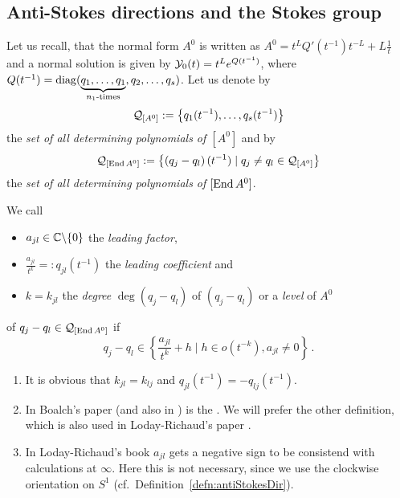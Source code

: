 \subsection{Anti-Stokes directions and the Stokes group}
Let us recall, that the normal form $A^0$ is written as
$A^0=t^LQ'(t^{-1})t^{-L}+L\frac{1}{t}$ and a normal solution is given by
$\mathcal{Y}_0(t)=t^Le^{Q(t^{-1})}$, where
$Q(t^{-1})=\diag(\underset{n_1\text{-times}}{\underbrace{%
  q_1,\dots,q_1}},q_2,\dots ,q_s)$.
Let us denote by
\[
  \mathcal{Q}_{[A^0]} := \left\{q_1(t^{-1}),\dots,q_s(t^{-1})\right\}
\]
the \emph{set of all determining polynomials of $[A^0]$} and by
\[
  \mathcal{Q}_{[\operatorname{End} A^0]}:=\left\{\left(q_j-q_l\right)(t^{-1})
    \mid q_j \neq q_l \in\mathcal{Q}_{[A^0]}
  \right\}
\]
the \emph{set of all determining polynomials of $[\operatorname{End} A^0]$}.
\begin{defn}\label{defn:determiningPolysOfEndA}
  We call
  \begin{itemize}
    \item $a_{jl}\in\mathbb{C}\backslash\{0\}$ the \emph{leading factor},
    \item $\frac{a_{jl}}{t^{k}}=:q_{jl}(t^{-1})$ the \emph{leading
      coefficient} and
    \item $k=k_{jl}$ the \emph{degree} $\deg(q_j-q_l)$ of $(q_j-q_l)$ or a
      \emph{level} of $A^0$
  \end{itemize}
  of $q_j-q_l\in\mathcal{Q}_{[\operatorname{End} A^0]}$ if
  \[
    q_j-q_l\in\left\{\frac{a_{jl}}{t^{k}}+h \mid h \in o(t^{-k}), a_{jl}\neq0
    \right\}\,.
  \]
  \begin{s-rem}
    \begin{enumerate}
      \item It is obvious that $k_{jl}=k_{lj}$ and
        $q_{jl}(t^{-1})=-q_{lj}(t^{-1})$.
      \item In Boalch's paper \cite{boalch} (and also in \cite{thboalch}) is
        the .
        We will prefer the other definition, which is also used in
        Loday-Richaud's paper \cite{Loday1994}.
      \item In Loday-Richaud's book \cite[Def.4.3.6]{Loday2014} $a_{jl}$ gets a
        negative sign to be consistend with calculations at $\infty$. Here this
        is not necessary, since we use the clockwise orientation on $S^1$
        (cf.\ Definition~\ref{defn:antiStokesDir}).
        \begin{comment}
          Does that mean that, to be consistend with \cite{boalch}, one has to
          invert the permutation matrix?

\end{comment}
\end{enumerate}
\end{s-rem}
\end{defn}
